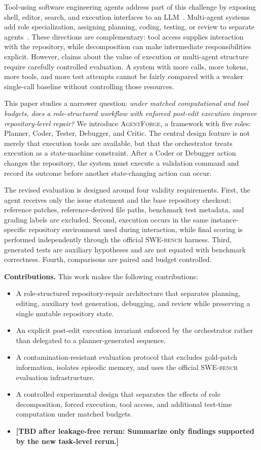 \documentclass[journal]{IEEEtran}
\newcommand{\agentforge}{\textsc{AgentForge}}
\newcommand{\swebench}{\textsc{SWE-bench}}
\newcommand{\tbd}[1]{\textcolor{red!70!black}{\textbf{[TBD after leakage-free rerun: #1]}}}
\begin{document}
Tool-using software engineering agents address part of this challenge by exposing shell, editor, search, and execution interfaces to an LLM~\cite{yang2024sweagent,wang2024openhands,zhang2024autocoderover}. Multi-agent systems add role specialization, assigning planning, coding, testing, or review to separate agents~\cite{tao2024magis,khanzadeh2025agentmesh,hong2023metagpt,qian2023chatdev}. These directions are complementary: tool access supplies interaction with the repository, while decomposition can make intermediate responsibilities explicit. However, claims about the value of execution or multi-agent structure require carefully controlled evaluation. A system with more calls, more tokens, more tools, and more test attempts cannot be fairly compared with a weaker single-call baseline without controlling those resources.

This paper studies a narrower question: \emph{under matched computational and tool budgets, does a role-structured workflow with enforced post-edit execution improve repository-level repair?} We introduce \agentforge{}, a framework with five roles: Planner, Coder, Tester, Debugger, and Critic. The central design feature is not merely that execution tools are available, but that the orchestrator treats execution as a state-machine constraint. After a Coder or Debugger action changes the repository, the system must execute a validation command and record its outcome before another state-changing action can occur.

The revised evaluation is designed around four validity requirements. First, the agent receives only the issue statement and the base repository checkout; reference patches, reference-derived file paths, benchmark test metadata, and grading labels are excluded. Second, execution occurs in the same instance-specific repository environment used during interaction, while final scoring is performed independently through the official \swebench{} harness. Third, generated tests are auxiliary hypotheses and are not equated with benchmark correctness. Fourth, comparisons are paired and budget controlled.

\textbf{Contributions.} This work makes the following contributions:
\begin{itemize}
    \item A role-structured repository-repair architecture that separates planning, editing, auxiliary test generation, debugging, and review while preserving a single mutable repository state.
    \item An explicit post-edit execution invariant enforced by the orchestrator rather than delegated to a planner-generated sequence.
    \item A contamination-resistant evaluation protocol that excludes gold-patch information, isolates episodic memory, and uses the official \swebench{} evaluation infrastructure.
    \item A controlled experimental design that separates the effects of role decomposition, forced execution, tool access, and additional test-time computation under matched budgets.
    \item \tbd{Summarize only findings supported by the new task-level rerun.}
\end{itemize}
\end{document}
